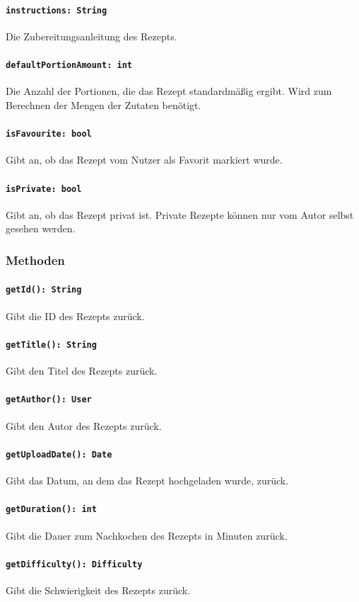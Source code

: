 \documentclass{entwurfsheft}
\begin{document}
\paragraph{\texttt{instructions: String}}
Die Zubereitungsanleitung des Rezepts.
\paragraph{\texttt{defaultPortionAmount: int}}
Die Anzahl der Portionen, die das Rezept standardmäßig ergibt. Wird zum Berechnen der Mengen der Zutaten benötigt.
\paragraph{\texttt{isFavourite: bool}}
Gibt an, ob das Rezept vom Nutzer als Favorit markiert wurde.
\paragraph{\texttt{isPrivate: bool}}
Gibt an, ob das Rezept privat ist. Private Rezepte können nur vom Autor selbst gesehen werden.

\subsubsection*{Methoden}
\paragraph{\texttt{getId(): String}}
Gibt die ID des Rezepts zurück.
\paragraph{\texttt{getTitle(): String}}
Gibt den Titel des Rezepts zurück.
\paragraph{\texttt{getAuthor(): User}}
Gibt den Autor des Rezepts zurück.
\paragraph{\texttt{getUploadDate(): Date}}
Gibt das Datum, an dem das Rezept hochgeladen wurde, zurück.
\paragraph{\texttt{getDuration(): int}}
Gibt die Dauer zum Nachkochen des Rezepts in Minuten zurück.
\paragraph{\texttt{getDifficulty(): Difficulty}}
Gibt die Schwierigkeit des Rezepts zurück.
\end{document}
